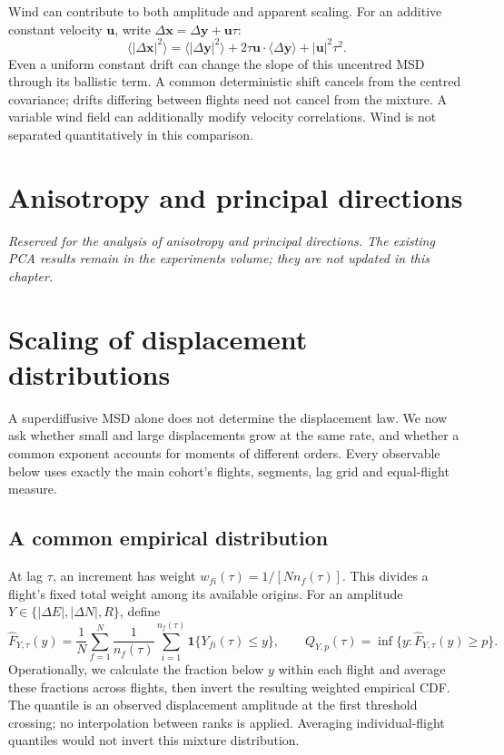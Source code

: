 Wind can contribute to both amplitude and apparent scaling. For an additive constant
velocity $\boldsymbol u$, write $\Delta\boldsymbol x=\Delta\boldsymbol y+\boldsymbol u\tau$:
\begin{equation}
 \langle|\Delta\boldsymbol x|^2\rangle
 =\langle|\Delta\boldsymbol y|^2\rangle
 +2\tau\boldsymbol u\cdot\langle\Delta\boldsymbol y\rangle+|\boldsymbol u|^2\tau^2.
 \label{eq:fixed-wind}
\end{equation}
Even a uniform constant drift can change the slope of this uncentred MSD through its
ballistic term. A common deterministic shift cancels from the centred covariance;
drifts differing between flights need not cancel from the mixture. A variable wind
field can additionally modify velocity correlations. Wind is not separated quantitatively
in this comparison.
\FloatBarrier

\section{Anisotropy and principal directions}
\label{sec:fixed-anisotropy}
\emph{Reserved for the analysis of anisotropy and principal directions. The existing
PCA results remain in the experiments volume; they are not updated in this chapter.}

\section{Scaling of displacement distributions}
\label{sec:fixed-scaling}

A superdiffusive MSD alone does not determine the displacement law. We now ask whether
small and large displacements grow at the same rate, and whether a common exponent
accounts for moments of different orders. Every observable below uses exactly the
main cohort's flights, segments, lag grid and equal-flight measure.

\subsection{A common empirical distribution}

At lag $\tau$, an increment has weight
$w_{fi}(\tau)=1/[Nn_f(\tau)]$. This divides a flight's fixed total weight among its
available origins. For an amplitude $Y\in\{|\Delta E|,|\Delta N|,R\}$, define
\begin{equation}
 \widehat F_{Y,\tau}(y)=\frac1N\sum_{f=1}^N\frac1{n_f(\tau)}
 \sum_{i=1}^{n_f(\tau)}\mathbf1\{Y_{fi}(\tau)\leq y\},\qquad
 Q_{Y,p}(\tau)=\inf\{y:\widehat F_{Y,\tau}(y)\geq p\}.
 \label{eq:fixed-cdf}
\end{equation}
Operationally, we calculate the fraction below $y$ within each flight and average
these fractions across flights, then invert the resulting weighted empirical CDF.
The quantile is an observed displacement amplitude at the first threshold crossing;
no interpolation between ranks is applied. Averaging individual-flight quantiles
would not invert this mixture distribution.

